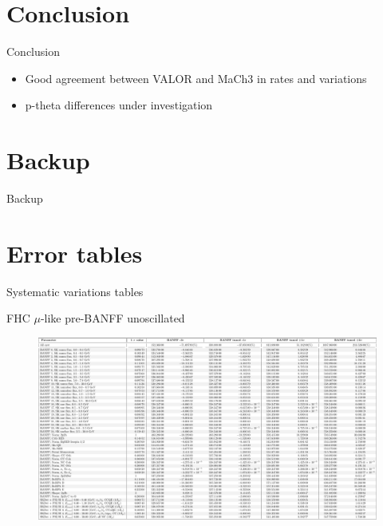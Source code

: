 \documentclass{beamer}
\begin{document}
\section{Conclusion}
\begin{frame}{Conclusion}
	\centering
	\begin{itemize}
		\item Good agreement between VALOR and MaCh3 in rates and variations
		\item p-theta differences under investigation
	\end{itemize}
\end{frame}

\section{Backup}
\begin{frame}
	\centering
	\Large Backup
\end{frame}

\section{Error tables}
\begin{frame}
	\centering
	\Large Systematic variations tables
\end{frame}

\begin{frame}{FHC $\mu$-like pre-BANFF unoscillated}
	\centering
	\begin{figure}
		\includegraphics[page=1, trim={0cm 0cm 0cm 0cm}, clip, scale=0.25] {images/variations/tables/systematic_tables_prefit_unosc_1Rmu}
	\end{figure}
\end{frame}
\end{document}
